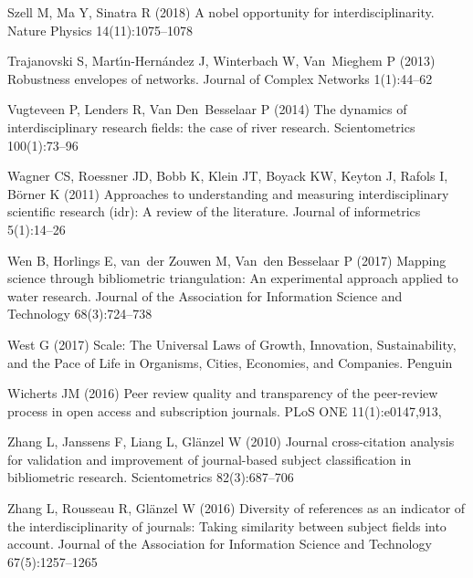 \documentclass[10pt]{article}
\begin{document}
\begin{thebibliography}{84}
Szell M, Ma Y, Sinatra R (2018) A nobel opportunity for interdisciplinarity.
  Nature Physics 14(11):1075--1078

Trajanovski S, Mart{\'\i}n-Hern{\'a}ndez J, Winterbach W, Van~Mieghem P (2013)
  Robustness envelopes of networks. Journal of Complex Networks 1(1):44--62

Vugteveen P, Lenders R, Van Den~Besselaar P (2014) The dynamics of
  interdisciplinary research fields: the case of river research. Scientometrics
  100(1):73--96

Wagner CS, Roessner JD, Bobb K, Klein JT, Boyack KW, Keyton J, Rafols I,
  B{\"o}rner K (2011) Approaches to understanding and measuring
  interdisciplinary scientific research (idr): A review of the literature.
  Journal of informetrics 5(1):14--26

Wen B, Horlings E, van~der Zouwen M, Van~den Besselaar P (2017) Mapping science
  through bibliometric triangulation: An experimental approach applied to water
  research. Journal of the Association for Information Science and Technology
  68(3):724--738

West G (2017) Scale: The Universal Laws of Growth, Innovation, Sustainability,
  and the Pace of Life in Organisms, Cities, Economies, and Companies. Penguin

Wicherts JM (2016) Peer review quality and transparency of the peer-review
  process in open access and subscription journals. PLoS ONE 11(1):e0147,913,

Zhang L, Janssens F, Liang L, Gl{\"a}nzel W (2010) Journal cross-citation
  analysis for validation and improvement of journal-based subject
  classification in bibliometric research. Scientometrics 82(3):687--706

Zhang L, Rousseau R, Gl{\"a}nzel W (2016) Diversity of references as an
  indicator of the interdisciplinarity of journals: Taking similarity between
  subject fields into account. Journal of the Association for Information
  Science and Technology 67(5):1257--1265

\end{thebibliography}
\end{document}
